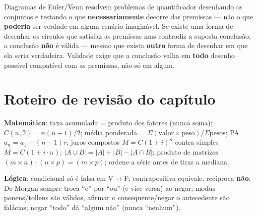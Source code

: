 \begin{conceito}
Diagramas de Euler/Venn resolvem problemas de quantificador desenhando os
conjuntos e testando o que \textbf{necessariamente} decorre das premissas
--- não o que \textbf{poderia} ser verdade em algum cenário imaginável. Se
existe uma forma de desenhar os círculos que satisfaz as premissas mas
contradiz a suposta conclusão, a conclusão \textbf{não} é válida --- mesmo
que exista \textbf{outra} forma de desenhar em que ela seria verdadeira.
Validade exige que a conclusão valha em \textbf{todo} desenho possível
compatível com as premissas, não só em algum.
\end{conceito}

\section{Roteiro de revisão do capítulo}

\begin{regrapratica}
\textbf{Matemática}: taxa acumulada = produto dos fatores (nunca soma);
$C(n,2) = n(n-1)/2$; média ponderada = $\Sigma(\text{valor}\times
\text{peso})/\Sigma\text{pesos}$; PA $a_n = a_1+(n-1)r$; juros compostos
$M=C(1+i)^n$ contra simples $M=C(1+i\cdot n)$; $|A\cup B| = |A|+|B|-|A\cap
B|$; produto de matrizes $(m\times n)\cdot(n\times p)=(m\times p)$;
ordene a série antes de tirar a mediana.

\textbf{Lógica}: condicional só é falsa em V$\to$F; contrapositiva
equivale, recíproca \textbf{não}; De Morgan sempre troca “e” por “ou” (e
vice-versa) ao negar; modus ponens/tollens são válidos, afirmar o
consequente/negar o antecedente são falácias; negar “todo” dá “algum não”
(nunca “nenhum”).
\end{regrapratica}

